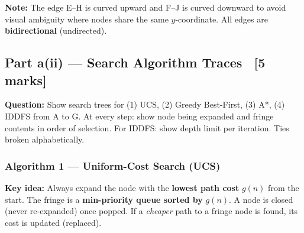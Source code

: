 \documentclass[12pt, a4paper]{article}
\newenvironment{solutionbox}{\begin{mdframed}[style=solutionframe]}{\end{mdframed}}
\newenvironment{notesbox}{\begin{mdframed}[style=notesframe]}{\end{mdframed}}
\newcommand{\node}[1]{\textbf{#1}}
\begin{document}
\begin{center}
\end{center}

\begin{notesbox}
\textbf{Note:} The edge E--H is curved upward and F--J is curved downward to avoid visual ambiguity where nodes share the same $y$-coordinate. All edges are \textbf{bidirectional} (undirected).
\end{notesbox}

\subsection{Part a(ii) — Search Algorithm Traces \ [5 marks]}

\begin{solutionbox}
\textbf{Question:} Show search trees for (1) UCS, (2) Greedy Best-First, (3) A*, (4) IDDFS from A to G.
At every step: show node being expanded and fringe contents in order of selection.
For IDDFS: show depth limit per iteration. Ties broken alphabetically.
\end{solutionbox}

\vspace{0.7em}

\subsubsection*{Algorithm 1 — Uniform-Cost Search (UCS)}

\textbf{Key idea:} Always expand the node with the \textbf{lowest path cost} $g(n)$ from the start.
The fringe is a \textbf{min-priority queue sorted by} $g(n)$.
A node is closed (never re-expanded) once popped.
If a \emph{cheaper} path to a fringe node is found, its cost is updated (replaced).
\end{document}
